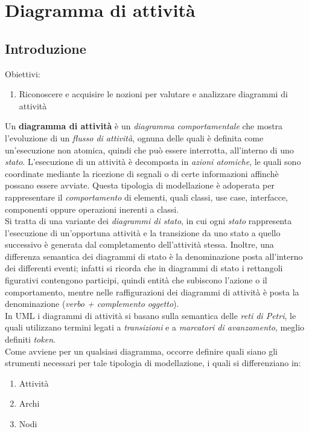 \documentclass{article}
\begin{document}
\pagestyle{empty}

\section*{Diagramma di attività}
\large
\subsection*{Introduzione}
\large
Obiettivi:
\begin{enumerate}
    \renewcommand{\labelenumi}{-}
    \itemsep0em
    \item Riconoscere e acquisire le nozioni per valutare e analizzare diagrammi di attività
\end{enumerate}
Un \textbf{diagramma di attività} è un \textit{diagramma comportamentale} che mostra l'evoluzione di un \textit{flusso di attività}, ognuna delle quali è definita come un'esecuzione non atomica, quindi che può essere interrotta, all'interno di uno \textit{stato}. L'esecuzione di un attività è decomposta in \textit{azioni atomiche}, le quali sono coordinate mediante la ricezione di segnali o di certe informazioni affinchè possano essere avviate. Questa tipologia di modellazione è adoperata per rappresentare il \textit{comportamento} di elementi, quali classi, use case, interfacce, componenti oppure operazioni inerenti a classi.\vspace*{14pt}\\
Si tratta di una variante dei \textit{diagrammi di stato}, in cui ogni \textit{stato} rappresenta l'esecuzione di un'opportuna attività e la transizione da uno stato a quello successivo è generata dal completamento dell'attività stessa. Inoltre, una differenza semantica dei diagrammi di stato è la denominazione posta all'interno dei differenti eventi; infatti si ricorda che in diagrammi di stato i rettangoli figurativi contengono participi, quindi entità che subiscono l'azione o il comportamento, mentre nelle raffigurazioni dei diagrammi di attività è posta la denominazione (\textit{verbo + complemento oggetto}).\vspace{14pt}\\
In UML i diagrammi di attività si basano sulla semantica delle \textit{reti di Petri}, le quali utilizzano termini legati a \textit{transizioni} e a \textit{marcatori di avanzamento}, meglio definiti \textit{token}.\vspace*{14pt}\\
Come avviene per un qualsiasi diagramma, occorre definire quali siano gli strumenti necessari per tale tipologia di modellazione, i quali si differenziano in:
\begin{enumerate}
    \renewcommand{\labelenumi}{-}
    \itemsep0em
    \item Attività
    \item Archi 
    \item Nodi
\end{enumerate}
\end{document}
